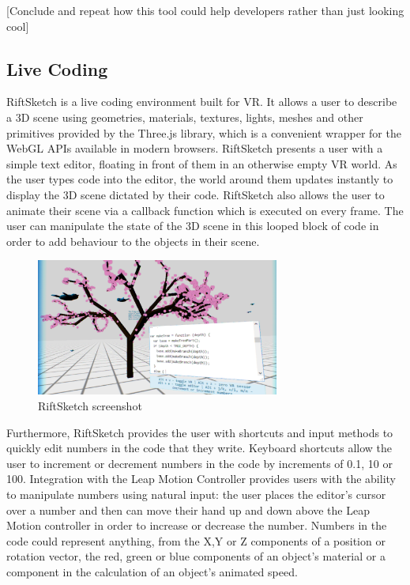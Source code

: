 \documentclass{acm_proc_article-sp}
\begin{document}
[Conclude and repeat how this tool could help developers rather than just looking cool]

\subsection{Live Coding}
RiftSketch is a live coding environment built for VR. It allows a user to describe a 3D scene using geometries, materials, textures, lights, meshes and other primitives provided by the Three.js library, which is a convenient wrapper for the WebGL APIs available in modern browsers. RiftSketch presents a user with a simple text editor, floating in front of them in an otherwise empty VR world. As the user types code into the editor, the world around them updates instantly to display the 3D scene dictated by their code. RiftSketch also allows the user to animate their scene via a callback function which is executed on every frame. The user can manipulate the state of the 3D scene in this looped block of code in order to add behaviour to the objects in their scene.

\begin{figure}[ht!]
\centering
\includegraphics[width=80mm]{figures/riftsketch/closer}
\caption{RiftSketch screenshot \label{riftsketch}}
\end{figure}

Furthermore, RiftSketch provides the user with shortcuts and input methods to quickly edit numbers in the code that they write. Keyboard shortcuts allow the user to increment or decrement numbers in the code by increments of 0.1, 10 or 100. Integration with the Leap Motion Controller provides users with the ability to manipulate numbers using natural input: the user places the editor's cursor over a number and then can move their hand up and down above the Leap Motion controller in order to increase or decrease the number. Numbers in the code could represent anything, from the X,Y or Z components of a position or rotation vector, the red, green or blue components of an object's material or a component in the calculation of an object's animated speed.
\end{document}
